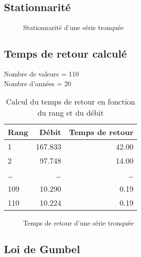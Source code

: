 \subsection{Stationnarité}
\begin{figure}[H]
    \centering
    \resizebox*{0.45\textwidth}{!}{
        
    }
    \caption{Stationnarité d'une série tronquée}
    \label{graph:stationnarite_serieTronquee}
\end{figure}

\subsection{Temps de retour calculé}
Nombre de valeurs = 110 \\
Nombre d'années = 20
\begin{multicols}{2}
    \begin{table}[H]
        \centering
        \begin{tabular}{l|r|r}
            \hline
            \textbf{Rang} & \textbf{Débit} & \textbf{Temps de retour} \\
            \hline
            1             & 167.833        & 42.00                    \\
            2             & 97.748         & 14.00                    \\
            \dots         & \dots          & \dots                    \\
            109           & 10.290         & 0.19                     \\
            110           & 10.224         & 0.19                     \\
            \hline
        \end{tabular}
        \caption{Calcul du temps de retour en fonction du rang et du débit}
        \label{tab:serieTronquee_tempsRetour}
    \end{table}

    \columnbreak

    \begin{figure}[H]
        \centering
        \resizebox*{0.45\textwidth}{!}{
            
        }
        \caption{Temps de retour d'une série tronquée}
        \label{graph:tempsRetour_serieTronquee}
    \end{figure}
\end{multicols}

\subsection{Loi de Gumbel}

